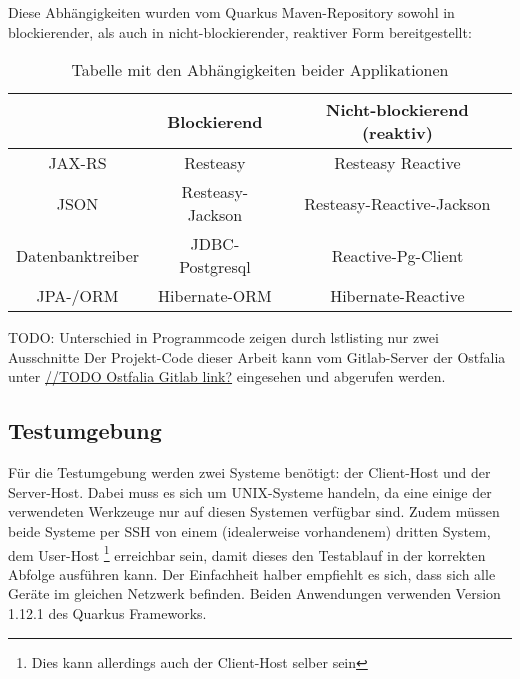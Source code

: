 Diese Abhängigkeiten wurden vom Quarkus Maven-Repository sowohl in blockierender,
als auch in nicht-blockierender, reaktiver Form bereitgestellt: \cite{MavenQuarkusIO}
\setlength{\tabcolsep}{18pt}
\renewcommand{\arraystretch}{1.5}
\begin{table}[ht!]
    \centering
    \begin{tabular}{| c | c | c |}
        \hline
                         & Blockierend      & Nicht-blockierend (reaktiv) \\
        \hline
        JAX-RS           & Resteasy         & Resteasy Reactive           \\
        \hline
        JSON             & Resteasy-Jackson & Resteasy-Reactive-Jackson   \\
        \hline
        Datenbanktreiber & JDBC-Postgresql  & Reactive-Pg-Client          \\
        \hline
        JPA-/ORM         & Hibernate-ORM    & Hibernate-Reactive          \\
        \hline
    \end{tabular}
    \caption{Tabelle mit den Abhängigkeiten beider Applikationen}
    \label{table:dependencies}
\end{table}

TODO: Unterschied in Programmcode zeigen durch lstlisting nur zwei Ausschnitte
Der Projekt-Code dieser Arbeit kann vom Gitlab-Server der Ostfalia unter
\url{//TODO Ostfalia Gitlab link?} eingesehen und abgerufen werden.

\subsection{Testumgebung}
\label{section:testumgebung}
Für die Testumgebung werden zwei Systeme benötigt: der Client-Host und der Server-Host.
Dabei muss es sich um UNIX-Systeme handeln, da eine einige der verwendeten Werkzeuge nur
auf diesen Systemen verfügbar sind.
Zudem müssen beide Systeme per SSH von einem (idealerweise vorhandenem) dritten System, dem User-Host
\footnote{Dies kann allerdings auch der Client-Host selber sein}
erreichbar sein, damit dieses den Testablauf in der korrekten Abfolge ausführen kann.
Der Einfachheit halber empfiehlt es sich, dass sich alle Geräte im gleichen Netzwerk befinden.
Beiden Anwendungen verwenden Version 1.12.1 des Quarkus Frameworks.

